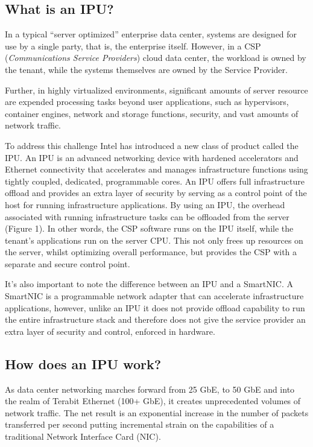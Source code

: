 \documentclass[../sn.tex]{subfiles}
\begin{document}
\subsection{What is an IPU?}
In a typical “server optimized” enterprise data center, systems
are designed for use by a single party, that is, the enterprise itself.
However, in a CSP (\textit{Communications Service Providers}) cloud data center, the workload is owned by
the tenant, while the systems themselves are owned by the
Service Provider.

Further, in highly virtualized environments, significant amounts
of server resource are expended processing tasks beyond user
applications, such as hypervisors, container engines, network
and storage functions, security, and vast amounts of network
traffic.

To address this challenge Intel has introduced a new class of
product called the IPU. An IPU is an advanced networking device
with hardened accelerators and Ethernet connectivity that
accelerates and manages infrastructure functions using tightly
coupled, dedicated, programmable cores. An IPU offers full
infrastructure offload and provides an extra layer of security by
serving as a control point of the host for running infrastructure
applications. By using an IPU, the overhead associated with running
infrastructure tasks can be offloaded from the server (Figure 1).
In other words, the CSP software runs on the IPU itself, while the
tenant's applications run on the server CPU. This not only frees
up resources on the server, whilst optimizing overall
performance, but provides the CSP with a separate and secure
control point.

It's also important to note the difference between an IPU and
a SmartNIC. A SmartNIC is a programmable network adapter
that can accelerate infrastructure applications, however,
unlike an IPU it does not provide offload capability to run the
entire infrastructure stack and therefore does not give the
service provider an extra layer of security and control,
enforced in hardware.

\subsection{How does an IPU work?}
As data center networking marches forward from 25 GbE, to 50
GbE and into the realm of Terabit Ethernet (100+ GbE), it creates
unprecedented volumes of network traffic. The net result is an
exponential increase in the number of packets transferred per
second putting incremental strain on the capabilities of a traditional
Network Interface Card (NIC).
\end{document}
